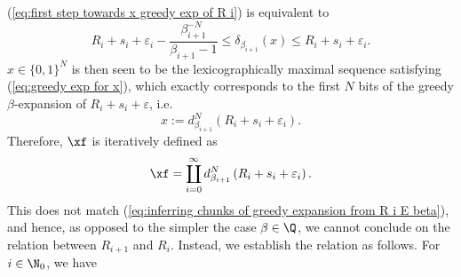 (\ref{eq:first step towards x greedy exp of R i}) is equivalent to 
\begin{equation}\label{eq:greedy exp for x beta r}
	R_i + s_i + \varepsilon_i - \frac{\beta_{i+1}^{-N}}{\beta_{i+1}-1} \leq \delta_{\beta_{i+1}}(x) \leq R_i + s_i + \varepsilon_i.
\end{equation}
$x \in \{0,1\}^N$ is then seen to be the lexicographically maximal sequence satisfying (\ref{eq:greedy exp for x}), which exactly corresponds to the first $N$ bits of the greedy $\beta$-expansion of $R_i + s_i + \varepsilon$, i.e.
\begin{equation}\label{eq:def x n i x n i + 1}
	x := d_{\beta_{i+1}}^N(R_i + s_i + \varepsilon_i).
\end{equation}
Therefore, $\xf$ is iteratively defined as 
\begin{equation}
	\xf = \coprod_{i=0}^\infty d_{\beta_{i+1}}^N\left(R_i + s_i+\varepsilon_i\right).
\end{equation}
This does not match (\ref{eq:inferring chunks of greedy expansion from R i E beta}), and
hence, as opposed to the simpler the case $\beta \in \Q$, we cannot conclude on the relation between $R_{i+1}$ and $R_i$. Instead, we establish the relation as follows. For $i \in \N_0$, we have
\allowdisplaybreaks
